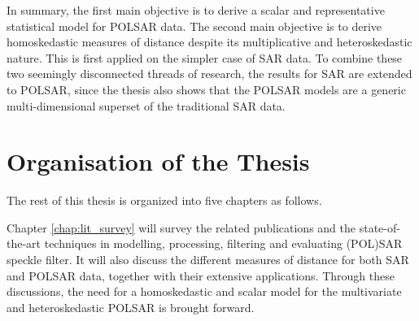 In summary, the first main objective is to derive a scalar and representative statistical model for POLSAR data.
The second main objective is to derive homoskedastic measures of distance despite its multiplicative and heteroskedastic nature.
This is first applied on the simpler case of SAR data. %
To combine these two seemingly disconnected threads of research, the results for SAR are extended to POLSAR,
  since the thesis also shows that the POLSAR models are a generic multi-dimensional superset of the traditional SAR data. %


\section{Organisation of the Thesis}
The rest of this thesis is organized into five chapters as follows.

Chapter \ref{chap:lit_survey} will survey the related publications
  and the state-of-the-art techniques in modelling, processing, filtering and evaluating (POL)SAR speckle filter. %
It will also discuss the different measures of distance for both SAR and POLSAR data, together with their extensive applications. 
Through these discussions, the need for a homoskedastic and scalar model for the multivariate and heteroskedastic POLSAR is brought forward.

